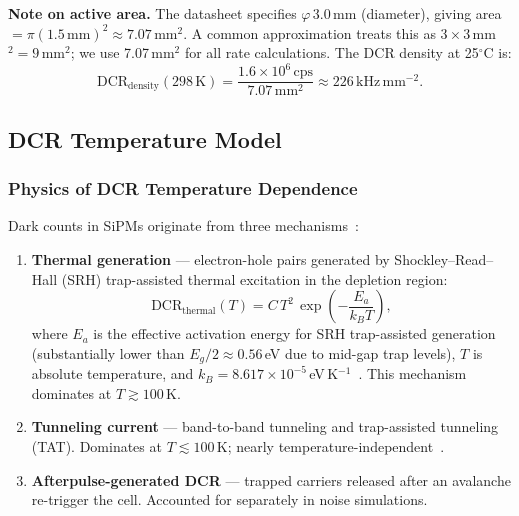 \textbf{Note on active area.} The datasheet specifies $\varphi\,3.0$\,mm (diameter),
giving area $= \pi(1.5\,\mathrm{mm})^2 \approx 7.07$\,mm$^2$. A common approximation
treats this as $3 \times 3$\,mm$^2 = 9$\,mm$^2$; we use 7.07\,mm$^2$ for all rate
calculations. The DCR density at 25$^\circ$C is:
\begin{equation}
  \mathrm{DCR}_{\mathrm{density}}(298\,\mathrm{K})
  = \frac{1.6 \times 10^6\,\mathrm{cps}}{7.07\,\mathrm{mm}^2}
  \approx 226\,\mathrm{kHz}\,\mathrm{mm}^{-2}.
  \label{eq:dcr_density_rt}
\end{equation}

\subsection{DCR Temperature Model}
\label{sec:dcr-model}

\subsubsection{Physics of DCR Temperature Dependence}

Dark counts in SiPMs originate from three mechanisms~\cite{Liu2022SiPMLN2}:

\begin{enumerate}
  \item \textbf{Thermal generation} — electron-hole pairs generated by Shockley--Read--Hall
    (SRH) trap-assisted thermal excitation in the depletion region:
    \begin{equation}
      \mathrm{DCR}_{\mathrm{thermal}}(T) = C\,T^2\,\exp\!\left(-\frac{E_a}{k_B T}\right),
      \label{eq:srh}
    \end{equation}
    where $E_a$ is the effective activation energy for SRH trap-assisted generation
    (substantially lower than $E_g/2 \approx 0.56$\,eV due to mid-gap trap levels),
    $T$ is absolute temperature, and
    $k_B = 8.617 \times 10^{-5}$\,eV\,K$^{-1}$~\cite{Liu2022SiPMLN2}.
    This mechanism dominates at $T \gtrsim 100$\,K.

  \item \textbf{Tunneling current} — band-to-band tunneling and trap-assisted tunneling
    (TAT). Dominates at $T \lesssim 100$\,K; nearly temperature-independent~\cite{Liu2022SiPMLN2}.

  \item \textbf{Afterpulse-generated DCR} — trapped carriers released after an avalanche
    re-trigger the cell. Accounted for separately in noise simulations.
\end{enumerate}

